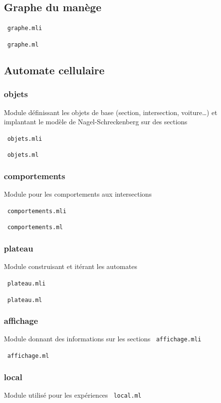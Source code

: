\documentclass[11pt]{article}
\begin{document}
	\subsection{Graphe du manège}

\label{grmli}
\verb+ graphe.mli+


\verb+ graphe.ml+

	\subsection{Automate cellulaire} 
	
			\subsubsection{objets}
Module définissant les objets de base (section, intersection, voiture…) et implantant le modèle de Nagel-Schreckenberg sur des sections

\verb+ objets.mli+


\verb+ objets.ml+

			\subsubsection{comportements}
Module pour les comportements aux intersections

\verb+ comportements.mli+


\verb+ comportements.ml+

			\subsubsection{plateau}
Module construisant et itérant les automates

\verb+ plateau.mli+


\verb+ plateau.ml+

			\subsubsection{affichage}
Module donnant des informations sur les sections
\verb+ affichage.mli+


\verb+ affichage.ml+

			\subsubsection{local}
Module utilisé pour les expériences
\verb+ local.ml+

\end{document}
